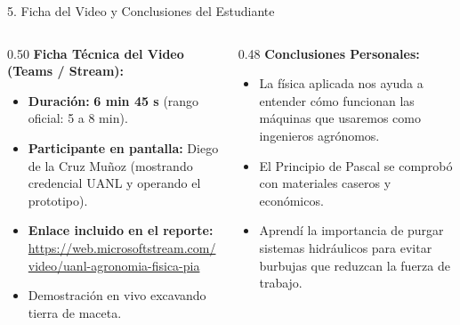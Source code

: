 \documentclass[
  spanish,
  aspectratio=169,
  xcolor={dvipsnames,table}
]{beamer}
\begin{document}
\begin{frame}{5. Ficha del Video y Conclusiones del Estudiante}
  \begin{columns}[T]
    \begin{column}{0.50\textwidth}
      \textbf{\color{uanlblue}Ficha Técnica del Video (Teams / Stream):}
      \begin{itemize}
        \item \textbf{Duración:} \textbf{6 min 45 s} (rango oficial: 5 a 8 min).
        \item \textbf{Participante en pantalla:} Diego de la Cruz Muñoz (mostrando credencial UANL y operando el prototipo).
        \item \textbf{Enlace incluido en el reporte:}
          {\fontsize{8}{10}\selectfont \url{https://web.microsoftstream.com/video/uanl-agronomia-fisica-pia}}
        \item Demostración en vivo excavando tierra de maceta.
      \end{itemize}
    \end{column}
    \begin{column}{0.48\textwidth}
      \textbf{\color{uanlblue}Conclusiones Personales:}
      \begin{itemize}
        \item La física aplicada nos ayuda a entender cómo funcionan las máquinas que usaremos como ingenieros agrónomos.
        \item El Principio de Pascal se comprobó con materiales caseros y económicos.
        \item Aprendí la importancia de purgar sistemas hidráulicos para evitar burbujas que reduzcan la fuerza de trabajo.
      \end{itemize}
    \end{column}
  \end{columns}
\end{frame}
\end{document}
